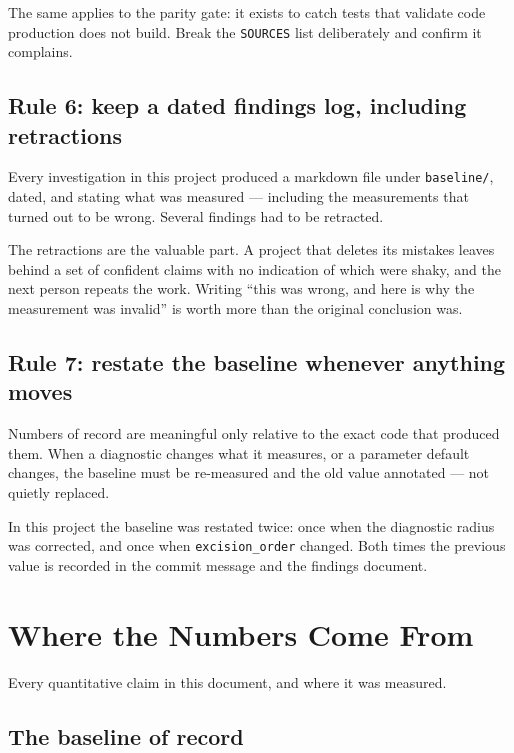 \documentclass[11pt,openany]{book}
\begin{document}
The same applies to the parity gate: it exists to catch tests that validate
code production does not build. Break the \texttt{SOURCES} list deliberately
and confirm it complains.

\section{Rule 6: keep a dated findings log, including retractions}

Every investigation in this project produced a markdown file under
\texttt{baseline/}, dated, and stating what was measured --- including the
measurements that turned out to be wrong. Several findings had to be retracted.

The retractions are the valuable part. A project that deletes its mistakes
leaves behind a set of confident claims with no indication of which were
shaky, and the next person repeats the work. Writing ``this was wrong, and
here is why the measurement was invalid'' is worth more than the original
conclusion was.

\section{Rule 7: restate the baseline whenever anything moves}

Numbers of record are meaningful only relative to the exact code that produced
them. When a diagnostic changes what it measures, or a parameter default
changes, the baseline must be re-measured and the old value annotated --- not
quietly replaced.

In this project the baseline was restated twice: once when the diagnostic
radius was corrected, and once when \texttt{excision\_order} changed. Both times
the previous value is recorded in the commit message and the findings document.

\chapter{Where the Numbers Come From}
\label{ch:numbers}

Every quantitative claim in this document, and where it was measured.

\section{The baseline of record}
\end{document}
